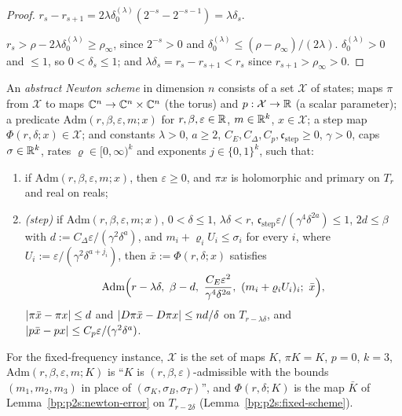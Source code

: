 \begin{proof}
\label{step:p2s:sch-rec}
$r_s-r_{s+1}=2\lambda\delta_0^{(\lambda)}(2^{-s}-2^{-s-1})=\lambda\delta_s$.

\label{step:p2s:sch-bd}
$r_s>\rho-2\lambda\delta_0^{(\lambda)}\ge\rho_\infty$, since $2^{-s}>0$ and $\delta_0^{(\lambda)}\le(\rho-\rho_\infty)/(2\lambda)$. $\delta_0^{(\lambda)}>0$ and $\le1$,
so $0<\delta_s\le1$; and $\lambda\delta_s=r_s-r_{s+1}<r_s$ since $r_{s+1}>\rho_\infty>0$.
\end{proof}

\begin{definition}\label{bp:p2s:scheme}
An \emph{abstract Newton scheme} in dimension $n$ consists of a set $\mathcal X$ of states; maps $\pi$ from $\mathcal X$ to maps
$\mathbb{C}^n\to\mathbb{C}^n\times\mathbb{C}^n$ (the torus) and $p:\mathcal X\to\mathbb{R}$ (a scalar parameter); a predicate $\mathrm{Adm}(r,\beta,\varepsilon,m;x)$ for
$r,\beta,\varepsilon\in\mathbb{R}$, $m\in\mathbb{R}^k$, $x\in\mathcal X$; a step map $\Phi(r,\delta;x)\in\mathcal X$; and constants $\lambda>0$, $a\ge2$,
$C_E,C_\Delta,C_p,\mathfrak c_{\mathrm{step}}\ge0$, $\gamma>0$, caps $\sigma\in\mathbb{R}^k$, rates $\varrho\in[0,\infty)^k$ and exponents
$j\in\{0,1\}^k$, such that:
\begin{enumerate}[label=(N\arabic*)]
\item\label{bp:p2s:N1} if $\mathrm{Adm}(r,\beta,\varepsilon,m;x)$, then $\varepsilon\ge0$, and $\pi x$ is holomorphic and primary on $T_r$ and real on reals;
\item\label{bp:p2s:N2} \emph{(step)} if $\mathrm{Adm}(r,\beta,\varepsilon,m;x)$, $0<\delta\le1$, $\lambda\delta<r$,
  $\mathfrak c_{\mathrm{step}}\varepsilon/(\gamma^4\delta^{2a})\le1$, $2d\le\beta$ with $d:=C_\Delta\varepsilon/(\gamma^2\delta^a)$, and $m_i+\varrho_iU_i\le\sigma_i$
  for every $i$, where $U_i:=\varepsilon/(\gamma^2\delta^{a+j_i})$, then $\bar x:=\Phi(r,\delta;x)$ satisfies
  \[
  \mathrm{Adm}\Bigl(r-\lambda\delta,\ \beta-d,\ \frac{C_E\varepsilon^2}{\gamma^4\delta^{2a}},\ (m_i+\varrho_iU_i)_i;\ \bar x\Bigr),
  \]
  $\lvert \pi\bar x-\pi x\rvert\le d$ and $\lvert D\pi\bar x-D\pi x\rvert\le nd/\delta$ on $T_{r-\lambda\delta}$, and $\lvert p\bar x-px\rvert\le
  C_p\varepsilon/(\gamma^2\delta^a)$.
\end{enumerate}
\end{definition}

For the fixed-frequency instance, $\mathcal X$ is the set of maps $K$, $\pi K=K$, $p=0$, $k=3$,
$\mathrm{Adm}(r,\beta,\varepsilon,m;K)$ is ``$K$ is $(r,\beta,\varepsilon)$-admissible with the bounds $(m_1,m_2,m_3)$ in place of
$(\sigma_K,\sigma_B,\sigma_T)$'', and $\Phi(r,\delta;K)$ is the map $\bar K$ of Lemma~\ref{bp:p2s:newton-error} on $T_{r-2\delta}$
(Lemma~\ref{bp:p2s:fixed-scheme}).

